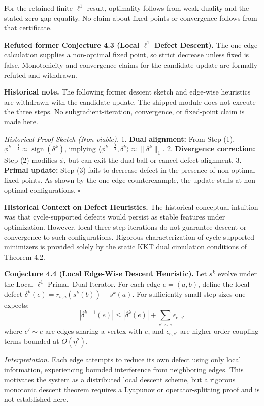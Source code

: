 \documentclass[
]{article}
\renewenvironment{quote}
  {\begin{leftbar}\small}
  {\end{leftbar}}
\begin{document}
For the retained finite \(\ell^1\) result, optimality follows from weak duality and the stated zero-gap equality. No claim about fixed points or convergence follows from that certificate.

\textbf{Refuted former Conjecture 4.3 (Local \(\ell^1\) Defect Descent).} The one-edge calculation supplies a non-optimal fixed point, so strict decrease unless fixed is false. Monotonicity and convergence claims for the candidate update are formally refuted and withdrawn.

\begin{quote}
\textbf{Historical note.} The following former descent sketch and edge-wise heuristics are withdrawn with the candidate update. The shipped module does not execute the three steps. No subgradient-iteration, convergence, or fixed-point claim is made here.
\end{quote}

\emph{Historical Proof Sketch (Non-viable).}
1. \textbf{Dual alignment:} From Step (1), \(\phi^{k+\frac{1}{2}} \approx \operatorname{sign}(\delta^k)\), implying \(\langle \phi^{k+\frac{1}{2}}, \delta^k \rangle \approx \|\delta^k\|_1\).
2. \textbf{Divergence correction:} Step (2) modifies \(\phi\), but can exit the dual ball or cancel defect alignment.
3. \textbf{Primal update:} Step (3) fails to decrease defect in the presence of non-optimal fixed points. As shown by the one-edge counterexample, the update stalls at non-optimal configurations. \(\square\)

\textbf{Historical Context on Defect Heuristics.} The historical conceptual intuition was that cycle-supported defects would persist as stable features under optimization. However, local three-step iterations do not guarantee descent or convergence to such configurations. Rigorous characterization of cycle-supported minimizers is provided solely by the static KKT dual circulation conditions of Theorem 4.2.

\textbf{Conjecture 4.4 (Local Edge-Wise Descent Heuristic).} Let \(s^k\) evolve under the Local \(\ell^1\) Primal--Dual Iterator. For each edge \(e = (a,b)\), define the local defect \(\delta^k(e) = r_{b,a}(s^k(b)) - s^k(a)\). For sufficiently small step sizes one expects:
\[ |\delta^{k+1}(e)| \le |\delta^k(e)| + \sum_{e' \sim e} \epsilon_{e,e'} \]
where \(e' \sim e\) are edges sharing a vertex with \(e\), and \(\epsilon_{e,e'}\) are higher-order coupling terms bounded at \(O(\eta^2)\).

\emph{Interpretation.} Each edge attempts to reduce its own defect using only local information, experiencing bounded interference from neighboring edges. This motivates the system as a distributed local descent scheme, but a rigorous monotonic descent theorem requires a Lyapunov or operator-splitting proof and is not established here.
\end{document}
